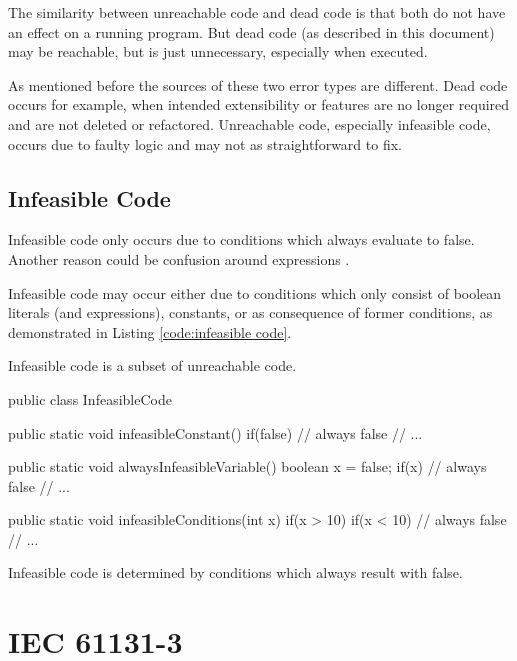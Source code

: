 The similarity between unreachable code and dead code is that both do not have an effect on a running program. But dead code (as described in this document) may be reachable, but is just unnecessary, especially when executed. 


As mentioned before the sources of these two error types are different.
Dead code occurs for example, when intended extensibility or features are no longer required and are not deleted or refactored.
Unreachable code, especially infeasible code, occurs due to faulty logic and may not as straightforward to fix.
\subsection{Infeasible Code}
\label{sub:infeasible code}

Infeasible code only occurs due to conditions which always evaluate to false. Another reason could be confusion around expressions \cite{Eichberg_2015}.


Infeasible code may occur either due to conditions which only consist of boolean literals (and expressions), constants, or as consequence of former conditions, as demonstrated in Listing \ref{code:infeasible code}.

Infeasible code is a subset of unreachable code.
\begin{program}[h!]
	\begin{JavaCode}
		public class InfeasibleCode {
			public static void infeasibleConstant() {
				if(false) {
					// always false
					// ...
				}
			}
			
			public static void alwaysInfeasibleVariable() {
				boolean x = false;
				if(x) {
					// always false
					// ...
				}
			}
			
			public static void infeasibleConditions(int x) {
				if(x > 10) {
					if(x < 10) {
						// always false
						// ...
					}
				}
			}
	}\end{JavaCode}
	\caption{Infeasible code is determined by conditions which always result with false. }
	\label{code:infeasible code}
\end{program}




\section{IEC 61131-3}
\label{sec:iec}

